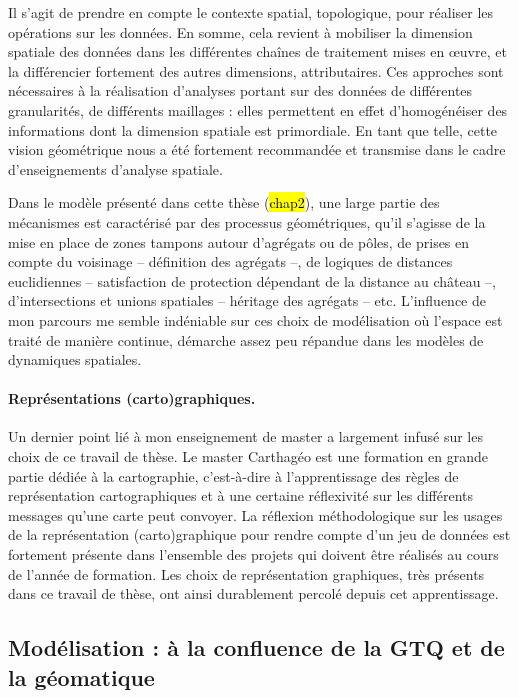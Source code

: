 Il s'agit de prendre en compte le contexte spatial, topologique, pour réaliser les opérations sur les données.
En somme, cela revient à mobiliser la dimension spatiale des données dans les différentes chaînes de traitement mises en œuvre, et la différencier fortement des autres dimensions, attributaires.
Ces approches sont nécessaires à la réalisation d'analyses portant sur des données de différentes granularités, de différents maillages : elles permettent en effet d'homogénéiser des informations dont la dimension spatiale est primordiale.
En tant que telle, cette vision \og géométrique\fg{} nous a été fortement recommandée et transmise dans le cadre d'enseignements d'analyse spatiale.

Dans le modèle présenté dans cette thèse (\hl{chap2}), une large partie des mécanismes est caractérisé par des processus géométriques, qu'il s'agisse de la mise en place de zones tampons autour d'agrégats ou de pôles, de prises en compte du voisinage -- définition des agrégats --, de logiques de distances euclidiennes -- satisfaction de protection dépendant de la distance au château --, d'intersections et unions spatiales -- héritage des agrégats -- etc.
L'influence de mon parcours me semble indéniable sur ces choix de modélisation où l'espace est traité de manière continue, démarche assez peu répandue dans les modèles de dynamiques spatiales.

\paragraph{Représentations (carto)graphiques.}

Un dernier point lié à mon enseignement de master a largement infusé sur les choix de ce travail de thèse.
Le master Carthagéo est une formation en grande partie dédiée à la cartographie, c'est-à-dire à l'apprentissage des \og règles\fg{} de représentation cartographiques et à une certaine réflexivité sur les différents messages qu'une carte peut convoyer.
La réflexion méthodologique sur les usages de la représentation (carto)graphique pour rendre compte d'un jeu de données est fortement présente dans l'ensemble des projets qui doivent être réalisés au cours de l'année de formation.
Les choix de représentation graphiques, très présents dans ce travail de thèse, ont ainsi durablement percolé depuis cet apprentissage.

\subsection{Modélisation : à la confluence de la GTQ et de la géomatique}

